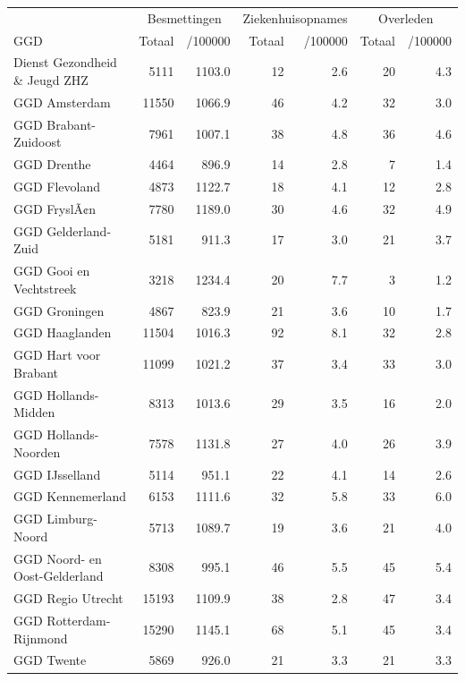 \documentclass[
  english,
  man,floatsintext]{apa6}
\begin{document}
\begin{table}
\centering\begingroup\fontsize{10}{12}\selectfont

\begin{threeparttable}
\begin{tabular}{lrrrrrr}
\toprule
\multicolumn{1}{c}{ } & \multicolumn{2}{c}{Besmettingen} & \multicolumn{2}{c}{Ziekenhuisopnames} & \multicolumn{2}{c}{Overleden} \\
\cmidrule(l{3pt}r{3pt}){2-3} \cmidrule(l{3pt}r{3pt}){4-5} \cmidrule(l{3pt}r{3pt}){6-7}
GGD & Totaal & /100000 & Totaal & /100000 & Totaal & /100000\\
\midrule
Dienst Gezondheid \& Jeugd ZHZ & 5111 & 1103.0 & 12 & 2.6 & 20 & 4.3\\
GGD Amsterdam & 11550 & 1066.9 & 46 & 4.2 & 32 & 3.0\\
GGD Brabant-Zuidoost & 7961 & 1007.1 & 38 & 4.8 & 36 & 4.6\\
GGD Drenthe & 4464 & 896.9 & 14 & 2.8 & 7 & 1.4\\
GGD Flevoland & 4873 & 1122.7 & 18 & 4.1 & 12 & 2.8\\
GGD FryslÃ¢n & 7780 & 1189.0 & 30 & 4.6 & 32 & 4.9\\
GGD Gelderland-Zuid & 5181 & 911.3 & 17 & 3.0 & 21 & 3.7\\
GGD Gooi en Vechtstreek & 3218 & 1234.4 & 20 & 7.7 & 3 & 1.2\\
GGD Groningen & 4867 & 823.9 & 21 & 3.6 & 10 & 1.7\\
GGD Haaglanden & 11504 & 1016.3 & 92 & 8.1 & 32 & 2.8\\
GGD Hart voor Brabant & 11099 & 1021.2 & 37 & 3.4 & 33 & 3.0\\
GGD Hollands-Midden & 8313 & 1013.6 & 29 & 3.5 & 16 & 2.0\\
GGD Hollands-Noorden & 7578 & 1131.8 & 27 & 4.0 & 26 & 3.9\\
GGD IJsselland & 5114 & 951.1 & 22 & 4.1 & 14 & 2.6\\
GGD Kennemerland & 6153 & 1111.6 & 32 & 5.8 & 33 & 6.0\\
GGD Limburg-Noord & 5713 & 1089.7 & 19 & 3.6 & 21 & 4.0\\
GGD Noord- en Oost-Gelderland & 8308 & 995.1 & 46 & 5.5 & 45 & 5.4\\
GGD Regio Utrecht & 15193 & 1109.9 & 38 & 2.8 & 47 & 3.4\\
GGD Rotterdam-Rijnmond & 15290 & 1145.1 & 68 & 5.1 & 45 & 3.4\\
GGD Twente & 5869 & 926.0 & 21 & 3.3 & 21 & 3.3\\

\end{tabular}
\end{threeparttable}
\end{table}
\end{document}
